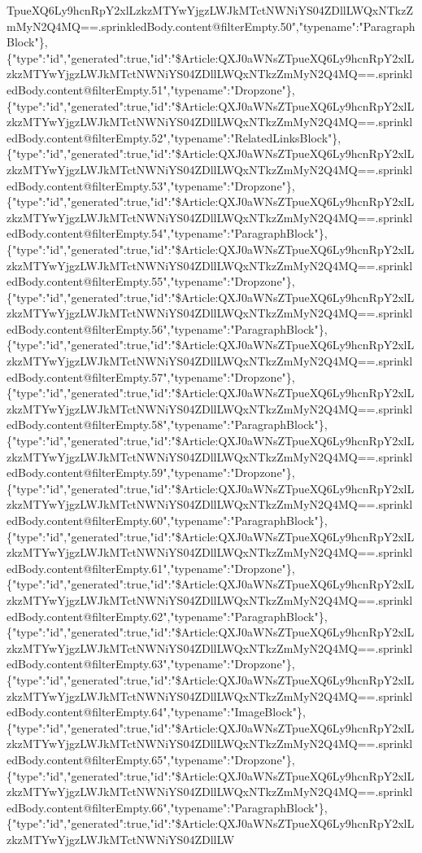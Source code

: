 TpueXQ6Ly9hcnRpY2xlLzkzMTYwYjgzLWJkMTctNWNiYS04ZDllLWQxNTkzZmMyN2Q4MQ==.sprinkledBody.content@filterEmpty.50","typename":"ParagraphBlock"\},\{"type":"id","generated":true,"id":"\$Article:QXJ0aWNsZTpueXQ6Ly9hcnRpY2xlLzkzMTYwYjgzLWJkMTctNWNiYS04ZDllLWQxNTkzZmMyN2Q4MQ==.sprinkledBody.content@filterEmpty.51","typename":"Dropzone"\},\{"type":"id","generated":true,"id":"\$Article:QXJ0aWNsZTpueXQ6Ly9hcnRpY2xlLzkzMTYwYjgzLWJkMTctNWNiYS04ZDllLWQxNTkzZmMyN2Q4MQ==.sprinkledBody.content@filterEmpty.52","typename":"RelatedLinksBlock"\},\{"type":"id","generated":true,"id":"\$Article:QXJ0aWNsZTpueXQ6Ly9hcnRpY2xlLzkzMTYwYjgzLWJkMTctNWNiYS04ZDllLWQxNTkzZmMyN2Q4MQ==.sprinkledBody.content@filterEmpty.53","typename":"Dropzone"\},\{"type":"id","generated":true,"id":"\$Article:QXJ0aWNsZTpueXQ6Ly9hcnRpY2xlLzkzMTYwYjgzLWJkMTctNWNiYS04ZDllLWQxNTkzZmMyN2Q4MQ==.sprinkledBody.content@filterEmpty.54","typename":"ParagraphBlock"\},\{"type":"id","generated":true,"id":"\$Article:QXJ0aWNsZTpueXQ6Ly9hcnRpY2xlLzkzMTYwYjgzLWJkMTctNWNiYS04ZDllLWQxNTkzZmMyN2Q4MQ==.sprinkledBody.content@filterEmpty.55","typename":"Dropzone"\},\{"type":"id","generated":true,"id":"\$Article:QXJ0aWNsZTpueXQ6Ly9hcnRpY2xlLzkzMTYwYjgzLWJkMTctNWNiYS04ZDllLWQxNTkzZmMyN2Q4MQ==.sprinkledBody.content@filterEmpty.56","typename":"ParagraphBlock"\},\{"type":"id","generated":true,"id":"\$Article:QXJ0aWNsZTpueXQ6Ly9hcnRpY2xlLzkzMTYwYjgzLWJkMTctNWNiYS04ZDllLWQxNTkzZmMyN2Q4MQ==.sprinkledBody.content@filterEmpty.57","typename":"Dropzone"\},\{"type":"id","generated":true,"id":"\$Article:QXJ0aWNsZTpueXQ6Ly9hcnRpY2xlLzkzMTYwYjgzLWJkMTctNWNiYS04ZDllLWQxNTkzZmMyN2Q4MQ==.sprinkledBody.content@filterEmpty.58","typename":"ParagraphBlock"\},\{"type":"id","generated":true,"id":"\$Article:QXJ0aWNsZTpueXQ6Ly9hcnRpY2xlLzkzMTYwYjgzLWJkMTctNWNiYS04ZDllLWQxNTkzZmMyN2Q4MQ==.sprinkledBody.content@filterEmpty.59","typename":"Dropzone"\},\{"type":"id","generated":true,"id":"\$Article:QXJ0aWNsZTpueXQ6Ly9hcnRpY2xlLzkzMTYwYjgzLWJkMTctNWNiYS04ZDllLWQxNTkzZmMyN2Q4MQ==.sprinkledBody.content@filterEmpty.60","typename":"ParagraphBlock"\},\{"type":"id","generated":true,"id":"\$Article:QXJ0aWNsZTpueXQ6Ly9hcnRpY2xlLzkzMTYwYjgzLWJkMTctNWNiYS04ZDllLWQxNTkzZmMyN2Q4MQ==.sprinkledBody.content@filterEmpty.61","typename":"Dropzone"\},\{"type":"id","generated":true,"id":"\$Article:QXJ0aWNsZTpueXQ6Ly9hcnRpY2xlLzkzMTYwYjgzLWJkMTctNWNiYS04ZDllLWQxNTkzZmMyN2Q4MQ==.sprinkledBody.content@filterEmpty.62","typename":"ParagraphBlock"\},\{"type":"id","generated":true,"id":"\$Article:QXJ0aWNsZTpueXQ6Ly9hcnRpY2xlLzkzMTYwYjgzLWJkMTctNWNiYS04ZDllLWQxNTkzZmMyN2Q4MQ==.sprinkledBody.content@filterEmpty.63","typename":"Dropzone"\},\{"type":"id","generated":true,"id":"\$Article:QXJ0aWNsZTpueXQ6Ly9hcnRpY2xlLzkzMTYwYjgzLWJkMTctNWNiYS04ZDllLWQxNTkzZmMyN2Q4MQ==.sprinkledBody.content@filterEmpty.64","typename":"ImageBlock"\},\{"type":"id","generated":true,"id":"\$Article:QXJ0aWNsZTpueXQ6Ly9hcnRpY2xlLzkzMTYwYjgzLWJkMTctNWNiYS04ZDllLWQxNTkzZmMyN2Q4MQ==.sprinkledBody.content@filterEmpty.65","typename":"Dropzone"\},\{"type":"id","generated":true,"id":"\$Article:QXJ0aWNsZTpueXQ6Ly9hcnRpY2xlLzkzMTYwYjgzLWJkMTctNWNiYS04ZDllLWQxNTkzZmMyN2Q4MQ==.sprinkledBody.content@filterEmpty.66","typename":"ParagraphBlock"\},\{"type":"id","generated":true,"id":"\$Article:QXJ0aWNsZTpueXQ6Ly9hcnRpY2xlLzkzMTYwYjgzLWJkMTctNWNiYS04ZDllLW
